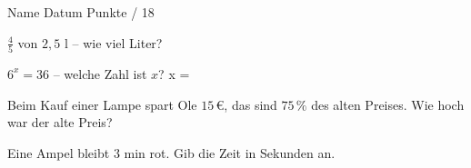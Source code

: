 \documentclass[11pt]{article}
\begin{document}
{}
\par\vspace{2pt}\noindent Name \underline{\hspace{7cm}}\hfill Datum \underline{\hspace{3cm}}\hfill Punkte \underline{\hspace{1.2cm}} / 18\par\vspace{6pt}
\small

\noindent\begin{minipage}[t]{0.485\linewidth}\raggedright
\begin{aufgabe}{$\frac{4}{5}$ von $2{,}5$ l – wie viel Liter? \leerfeld[l]}
\end{aufgabe}
\end{minipage}\hfill\begin{minipage}[t]{0.485\linewidth}\raggedright
\begin{aufgabe}{$6^x = 36$ – welche Zahl ist $x$? x = \leerfeld}
\end{aufgabe}
\end{minipage}\par

\noindent\begin{minipage}[t]{0.485\linewidth}\raggedright
\begin{aufgabe}{Beim Kauf einer Lampe spart Ole $15\,€$, das sind $75\,\%$ des alten Preises. Wie hoch war der alte Preis? \leerfeld[€]}
\end{aufgabe}
\end{minipage}\hfill\begin{minipage}[t]{0.485\linewidth}\raggedright
\begin{aufgabe}{Eine Ampel bleibt $3$ min rot. Gib die Zeit in Sekunden an. \leerfeld[s]}
\end{aufgabe}
\end{minipage}\par
\end{document}
